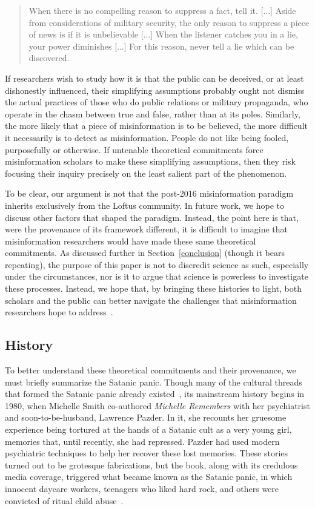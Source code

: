 \documentclass[          
 pre,
 twocolumn,
 twoside,
 superscriptaddress,
 amsmath,
 amssymb,                
 apsf
]{revtex4-2}
\begin{document}
\begin{quote}
    When there is no compelling reason to suppress a fact, tell it. [...] Aside from considerations of military security, the only reason to suppress a piece of news is if it is unbelievable [...] When the listener catches you in a lie, your power diminishes [...] For this reason, never tell a lie which can be discovered.
\end{quote}

If researchers wish to study how it is that the public can be deceived, or at least dishonestly influenced, their simplifying assumptions probably ought not dismiss the actual practices of those who do public relations or military propaganda, who operate in the chasm between true and false, rather than at its poles. Similarly, the more likely that a piece of misinformation is to be believed, the more difficult it necessarily is to detect as misinformation. People do not like being fooled, purposefully or otherwise. If untenable theoretical commitments force misinformation scholars to make these simplifying assumptions, then they risk focusing their inquiry precisely on the least salient part of the phenomenon.

To be clear, our argument is not that the post-2016 misinformation paradigm inherits exclusively from the Loftus community. In future work, we hope to discuss other factors that shaped the paradigm. Instead, the point here is that, were the provenance of its framework different, it is difficult to imagine that misinformation researchers would have made these same theoretical commitments. As discussed further in Section~\ref{conclusion} (though it bears repeating), the purpose of this paper is not to discredit science as such, especially under the circumstances, nor is it to argue that science is powerless to investigate these processes. Instead, we hope that, by bringing these histories to light, both scholars and the public can better navigate the challenges that misinformation researchers hope to address~\cite{porter_how_2009}.

\subsection{History}
\label{history}

To better understand these theoretical commitments and their provenance, we must briefly summarize the Satanic panic. Though many of the cultural threads that formed the Satanic panic already existed~\cite{emerson2024unmask}, its mainstream history begins in 1980, when Michelle Smith co-authored \textit{Michelle Remembers} with her psychiatrist and soon-to-be-husband, Lawrence Pazder. In it, she recounts her gruesome experience being tortured at the hands of a Satanic cult as a very young girl, memories that, until recently, she had repressed. Pazder had used modern psychiatric techniques to help her recover these lost memories. These stories turned out to be grotesque fabrications, but the book, along with its credulous media coverage, triggered what became known as the Satanic panic, in which innocent daycare workers, teenagers who liked hard rock, and others were convicted of ritual child abuse~\cite{hearst_qanon_2022,shewan_conviction_2015}.
\end{document}
